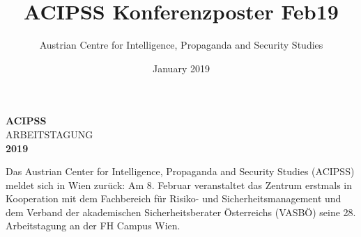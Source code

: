 \documentclass[a4paper,10pt]{article}
\title{ACIPSS Konferenzposter Feb19}
\author{Austrian Centre for Intelligence, Propaganda and Security Studies}
\date{January 2019}
\newcommand{\crosshairs}{{\color{acipssbeige!60}\fontsize{120pt}{40pt}\selectfont\faCrosshairs}}
\def \factor {2.5}
\begin{document}
\pagestyle{empty}
\begin{minipage}[t]{0.68\textwidth}
{\fontsize{40pt}{40pt}\selectfont\colorbox{acipssbeige!30}{\textbf{ACIPSS}}}\\
{\fontsize{40pt}{40pt}\selectfont\colorbox{acipssbeige!30}{ARBEITSTAGUNG}}\\
{\fontsize{40pt}{40pt}\selectfont\colorbox{acipssbeige!30}{\textbf{2019}}}
\end{minipage}\hfill\hspace{1cm}
\begin{minipage}[m]{0.29\textwidth}
\end{minipage}\hfill
\vspace{1em}

Das Austrian Center for Intelligence, Propaganda and Security Studies (ACIPSS) meldet sich in Wien zurück: Am 8. Februar veranstaltet das Zentrum erstmals in Kooperation mit dem Fachbereich für Risiko- und Sicherheitsmanagement und dem Verband der akademischen Sicherheitsberater Österreichs (VASBÖ) seine 28. Arbeitstagung an der FH Campus Wien.
\bigskip
\end{document}
